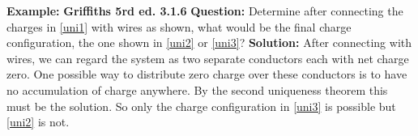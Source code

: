 \documentclass[a4paper,12pt]{report}
\begin{document}
	\begin{example_template}
		\textbf{Example:} \textbf{Griffiths 5rd ed. 3.1.6} \newline \newline
		\textbf{Question:} Determine after connecting the charges in \cref{uni1} with wires as shown, what would be the final charge configuration, the one shown in \cref{uni2} or \cref{uni3}?  \newline \newline 
		\textbf{Solution:}  After connecting with wires, we can regard the system as two separate conductors each with net charge zero. One possible way to distribute zero charge over these conductors is to have no accumulation of charge anywhere. By the second uniqueness theorem this must be the solution. So only the charge configuration in \cref{uni3} is possible but \cref{uni2} is not. 
	\end{example_template}
\end{document}

